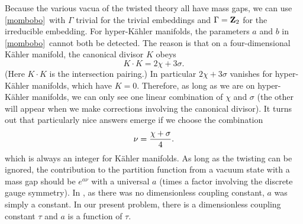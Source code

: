 \documentclass[12pt]{article}
\numberwithin{equation}{section}
\begin{document}
Because the various vacua of the twisted theory all have mass gaps,
we can use \eqref{mombobo}\ with $\Gamma$ trivial for the trivial embeddings
and $\Gamma={\bf Z}_2$ for the irreducible embedding.
For hyper-K\"ahler manifolds, the parameters $a$ and $b$ in \eqref{mombobo}\
cannot both be detected.  The reason is that
on a four-dimensional K\"ahler manifold, the canonical divisor $K$ obeys
\begin{equation}
  \label{itobeys}
  K\cdot K = 2\chi+3\sigma.
\end{equation}
(Here $K\cdot K$ is the intersection pairing.)  In particular
$2\chi+3\sigma$ vanishes for hyper-K\"ahler manifolds, which have $K=0$.
Therefore, as long as we are on hyper-K\"ahler manifolds, we can only
see one linear combination of $\chi$ and $\sigma$ (the other will appear when
we make corrections involving the canonical divisor).
It turns out that particularly nice answers
emerge if we choose the combination
\begin{equation}
  \label{defdel}
  \nu={\chi+\sigma\over 4}.
\end{equation}
which is always an integer for K\"ahler manifolds.
As long as the twisting can be ignored, the contribution to the partition
function from a vacuum state with a mass gap should be $e^{a\nu}$ with a
universal $a$ (times a factor involving the discrete gauge symmetry).
In \cite{switten}, as there was no dimensionless coupling constant, $a$
was simply a constant.  In our present problem, there is a dimensionless
coupling constant $\tau$ and $a$ is a function of $\tau$.
\end{document}
